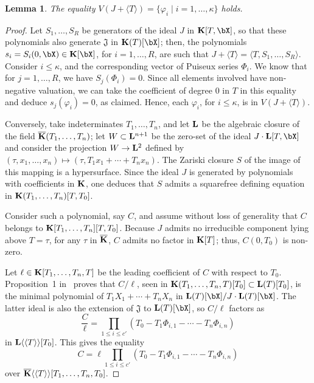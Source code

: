 \documentclass[12pt]{article}
\newtheorem{lemma}[definition]{Lemma}
\begin{document}
\begin{lemma}\label{lemma:Z1}
  The equality $V(J +\langle T \rangle)=\{\varphi_i \mid i=1,\dots,\kappa\}$ holds.
\end{lemma}
\begin{proof}
  Let $S_1,\dots,S_R$ be generators of the ideal $J$ in
  $\KK[T,\bX]$, so that these polynomials also generate
  $\mathfrak{J}$ in $\KK(T)[\bX]$; then, the polynomials
  $s_i=S_i(0,\bX) \in \KK[\bX]$, for $i=1,\dots,R$, are such that
  $J+\langle T\rangle = \langle T,S_1,\dots,S_R \rangle$.  Consider
  $i \le \kappa$, and the corresponding vector of Puiseux series
  $\Phi_i$. We know that for $j=1,\dots,R$, we have $S_j(\Phi_i)=0$.
  Since all elements involved have non-negative valuation, we can take
  the coefficient of degree $0$ in $T$ in this equality and deduce
  $s_j(\varphi_i)=0$, as claimed. Hence, each $\varphi_i$, for $i \le
  \kappa$, is in $V(J + \langle T \rangle)$.

  Conversely, take indeterminates $T_1,\dots,T_n$, and let $\mathbf{L}$ be
  the algebraic closure of the field $\overline{\mathbf{K}}(T_1,\dots,T_n)$; let
  $W\subset{\ensuremath{\mathbf{L}}}{}^{n+1}$ be the zero-set of the ideal $J\cdot
  \LL[T,\bX]$ and consider the projection $W \to {\ensuremath{\mathbf{L}}}{}^2$ defined
  by $(\tau,x_1,\dots,x_n)\mapsto (\tau,T_1 x_1 + \cdots + T_n x_n)$. The
  Zariski closure $S$ of the image of this mapping is a
  hypersurface. 
  Since
  the ideal $J$ is generated by polynomials with coefficients in $\mathbf{K}$,
  one deduces that $S$ admits a squarefree defining equation in
  $\mathbf{K}(T_1,\dots,T_n)[T,T_0]$.

  Consider such a polynomial, say $C$, and assume without loss of
  generality that $C$ belongs to 
  $\mathbf{K}[T_1,\dots,T_n][T,T_0]$. Because $J$ admits no irreducible
  component lying above $T=\tau$, for any $\tau$ in $\overline{\mathbf{K}}$, $C$
  admits no factor in $\mathbf{K}[T]$; thus, $C(0,T_0)$ is non-zero.

  Let $\ell \in \mathbf{K}[T_1,\dots,T_n,T]$ be the leading coefficient of
  $C$ with respect to $T_0$. Proposition~1 in~\cite{Schost03} proves
  that $C/\ell$, seen in $\mathbf{K}(T_1,\dots,T_n,T)[T_0] \subset
  \mathbf{L}(T)[T_0]$, is the minimal polynomial of $T_1 X_1 + \cdots +
  T_n X_n$ in $\LL(T)[\bX]/J\cdot \LL(T)[\bX]$. The latter ideal
  is also the extension of $\mathfrak{J}$ to $\LL(T)[\bX]$, 
  so $C/\ell$ factors as
  $$\frac C\ell = \prod_{1\le i \le c'}(T_0-T_1 \Phi_{i,1} - \cdots - T_n \Phi_{i,n})$$
  in $\mathbf{L}\langle\langle T \rangle\rangle[T_0]$.
  This gives the equality 
  $$C =\ell \prod_{1\le i \le  c'}(T_0-T_1 \Phi_{i,1} - \cdots - T_n
  \Phi_{i,n})$$ over $\overline{\mathbf{K}}\langle\langle T \rangle\rangle[T_1,\dots,T_n,T_0]$. 


\end{proof}
\end{document}
